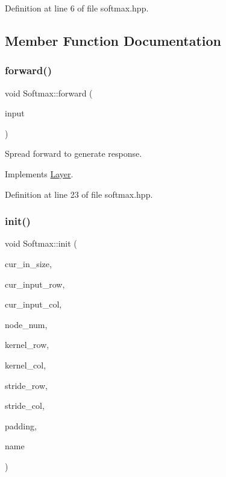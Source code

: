 Definition at line 6 of file softmax.\+hpp.



\subsection{Member Function Documentation}
\mbox{\label{class_softmax_a50805d8a6bc976b1ce73c3d87e1a2d5c}} 
\subsubsection{\texorpdfstring{forward()}{forward()}}
{\footnotesize\ttfamily void Softmax\+::forward (\begin{DoxyParamCaption}\item[{std\+::vector$<$ Eigen\+::\+Matrix\+Xd $>$}]{input }\end{DoxyParamCaption})\hspace{0.3cm}{\ttfamily [virtual]}}



Spread forward to generate response. 



Implements \hyperlink{class_layer_ac0b116d692ea457f8e7c0f79f7159004}{Layer}.



Definition at line 23 of file softmax.\+hpp.

\mbox{\label{class_softmax_ae1a672376cc4a904cedb36ad8b8df717}} 
\subsubsection{\texorpdfstring{init()}{init()}}
{\footnotesize\ttfamily void Softmax\+::init (\begin{DoxyParamCaption}\item[{int}]{cur\+\_\+in\+\_\+size,  }\item[{int}]{cur\+\_\+input\+\_\+row,  }\item[{int}]{cur\+\_\+input\+\_\+col,  }\item[{double}]{node\+\_\+num,  }\item[{double}]{kernel\+\_\+row,  }\item[{double}]{kernel\+\_\+col,  }\item[{double}]{stride\+\_\+row,  }\item[{double}]{stride\+\_\+col,  }\item[{std\+::string}]{padding,  }\item[{std\+::string}]{name }\end{DoxyParamCaption})\hspace{0.3cm}{\ttfamily [virtual]}}



